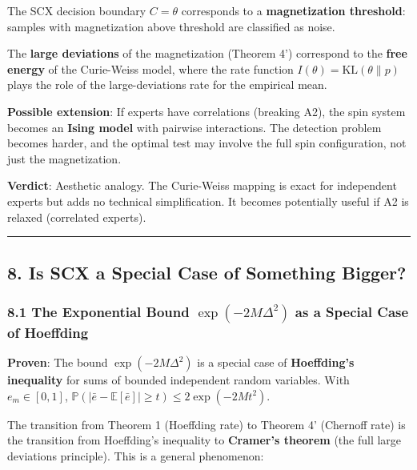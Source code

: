 \documentclass[
  12pt,
]{ctexart}
\begin{document}
The SCX decision boundary \(C = \theta\) corresponds to a
\textbf{magnetization threshold}: samples with magnetization above
threshold are classified as noise.

The \textbf{large deviations} of the magnetization (Theorem 4')
correspond to the \textbf{free energy} of the Curie-Weiss model, where
the rate function \(I(\theta) = \text{KL}(\theta\|p)\) plays the role of
the large-deviations rate for the empirical mean.

\textbf{Possible extension}: If experts have correlations (breaking A2),
the spin system becomes an \textbf{Ising model} with pairwise
interactions. The detection problem becomes harder, and the optimal test
may involve the full spin configuration, not just the magnetization.

\textbf{Verdict}: Aesthetic analogy. The Curie-Weiss mapping is exact
for independent experts but adds no technical simplification. It becomes
potentially useful if A2 is relaxed (correlated experts).

\begin{center}\rule{0.5\linewidth}{0.5pt}\end{center}

\subsection{8. Is SCX a Special Case of Something
Bigger?}\label{is-scx-a-special-case-of-something-bigger}

\subsubsection{\texorpdfstring{8.1 The Exponential Bound
\(\exp(-2M\Delta^2)\) as a Special Case of
Hoeffding}{8.1 The Exponential Bound \textbackslash exp(-2M\textbackslash Delta\^{}2) as a Special Case of Hoeffding}}\label{the-exponential-bound-exp-2mdelta2-as-a-special-case-of-hoeffding}

\textbf{Proven}: The bound \(\exp(-2M\Delta^2)\) is a special case of
\textbf{Hoeffding's inequality} for sums of bounded independent random
variables. With \(e_m \in [0,1]\),
\(\mathbb{P}(|\bar{e} - \mathbb{E}[\bar{e}]| \geq t) \leq 2\exp(-2Mt^2)\).

The transition from Theorem 1 (Hoeffding rate) to Theorem 4' (Chernoff
rate) is the transition from Hoeffding's inequality to \textbf{Cramer's
theorem} (the full large deviations principle). This is a general
phenomenon:
\end{document}
